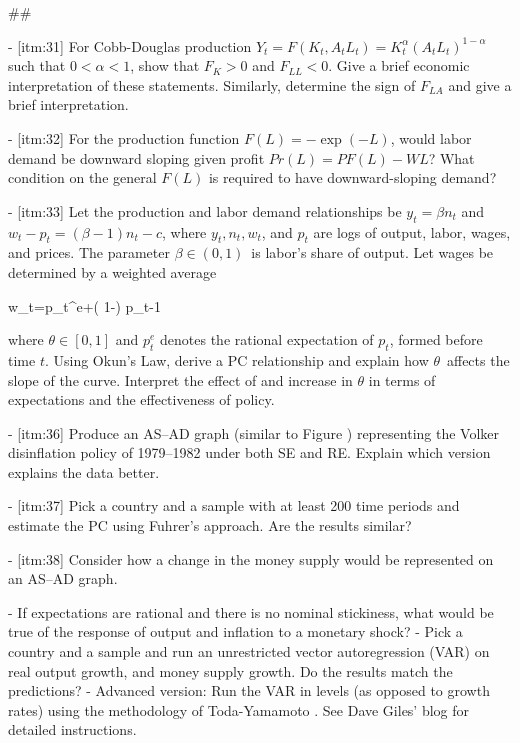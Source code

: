 ﻿\documentclass[oneside]{book}
\begin{document}
##




- [itm:31] For Cobb-Douglas production $Y_{t}=F( K_{t},A_{t}L_{t})
=K_{t}^{\alpha }( A_{t}L_{t}) ^{1-\alpha }$ such that $0<\alpha
<1$, show that $F_{K}>0$ and $F_{LL}<0$. Give a brief economic
interpretation of these statements. Similarly, determine the sign of $F_{LA}$ and give a brief interpretation.

- [itm:32] For the production function $F( L) =-\exp ( -L) $, would labor demand be downward sloping given profit $Pr( L)
=PF( L) -WL$? What condition on the general $F( L) $
is required to have downward-sloping demand?

- [itm:33] Let the production and labor demand relationships be $y_{t}=\beta
n_{t} $ and $w_{t}-p_{t}=( \beta -1) n_{t}-c$, where $y_{t},n_{t},w_{t}$, and $p_{t}$ are logs of output, labor, wages, and prices. The parameter $\beta \in ( 0,1) $\ is labor's share of output. Let wages be determined by a weighted average



w_{t}=\theta p_{t}^{e}+( 1-\theta ) p_{t-1}


where $\theta \in [ 0,1] $ and $p_{t}^{e}$ denotes the rational
expectation of $p_{t}$, formed before time $t$.
Using Okun's Law, derive a PC relationship and explain how $\theta $\ affects the slope of the curve. Interpret the effect of and
increase in $\theta $ in terms of expectations and the effectiveness of
policy.

- [itm:36] Produce an AS--AD graph (similar to Figure ) representing the Volker disinflation policy of 1979--1982 under both SE and RE. Explain
which version explains the data better.

- [itm:37] Pick a country and a sample with at least 200 time periods and
estimate the PC using Fuhrer's approach. Are the results similar?

- [itm:38] Consider how a change in the money supply would be represented on an AS--AD graph.

- If expectations are rational and there is no nominal stickiness,
what would be true of the response of output and inflation to a monetary
shock?
- Pick a country and a sample and run an unrestricted vector autoregression (VAR) on real output growth, and money supply growth. Do the results match the
predictions?
- Advanced version: Run the VAR in levels (as opposed to growth rates) using the methodology of Toda-Yamamoto .
See Dave Giles' blog  for detailed instructions.
\end{document}
